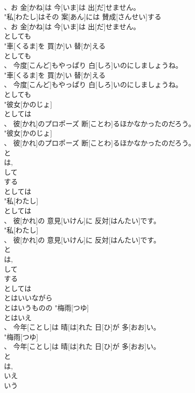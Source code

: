 \documentclass[8pt]{extreport}
\begin{document}
\begin{CJK}{UTF8}{min}
\\	、お 金[かね]は 今[いま]は 出[だ]せません。
\\	"私[わたし]はその 案[あん]には 賛成[さんせい]する
\\	、お 金[かね]は 今[いま]は 出[だ]せません。
\\	としても
\\	"車[くるま]を 買[か]い 替[か]える
\\	としても
\\	、 今度[こんど]もやっぱり 白[しろ]いのにしましょうね。
\\	"車[くるま]を 買[か]い 替[か]える
\\	、 今度[こんど]もやっぱり 白[しろ]いのにしましょうね。
\\	としても
\\	"彼女[かのじょ]
\\	としては
\\	、 彼[かれ]のプロポーズ 断[ことわ]るほかなかったのだろう。
\\	"彼女[かのじょ]
\\	、 彼[かれ]のプロポーズ 断[ことわ]るほかなかったのだろう。
\\	と 
\\	は, 
\\	して 
\\	する	
\\	としては
\\	"私[わたし]
\\	としては
\\	、 彼[かれ]の 意見[いけん]に 反対[はんたい]です。
\\	"私[わたし]
\\	、 彼[かれ]の 意見[いけん]に 反対[はんたい]です。
\\	と 
\\	は, 
\\	して 
\\	する	
\\	としては
\\	とはいいながら 
\\	とはいうものの	"梅雨[つゆ]
\\	とはいえ
\\	、 今年[ことし]は 晴[は]れた 日[ひ]が 多[おお]い。
\\	"梅雨[つゆ]
\\	、 今年[ことし]は 晴[は]れた 日[ひ]が 多[おお]い。
\\	と 
\\	は, 
\\	いえ 
\\	いう 

\end{CJK}
\end{document}
